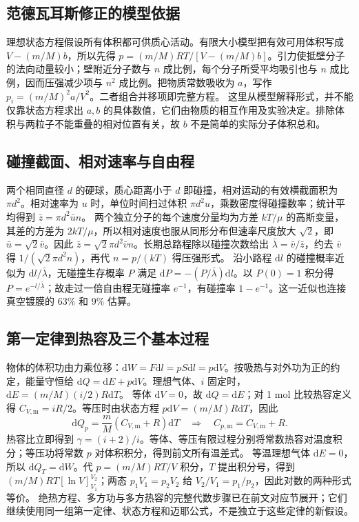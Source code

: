 \documentclass[UTF8,fontset=none,zihao=-4,a4paper]{ctexart}
\begin{document}
\subsection{范德瓦耳斯修正的模型依据}
理想状态方程假设所有体积都可供质心活动。有限大小模型把有效可用体积写成 $V-(m/M)b$，所以先得 $p=(m/M)RT/[V-(m/M)b]$。引力使抵壁分子的法向动量较小；壁附近分子数与 $n$ 成比例，每个分子所受平均吸引也与 $n$ 成比例，因而压强减少项与 $n^2$ 成比例。把物质常数吸收为 $a$，写作 $p_i=(m/M)^2a/V^2$。二者组合并移项即完整方程。
这里从模型解释形式，并不能仅靠状态方程求出 $a,b$ 的具体数值，它们由物质的相互作用及实验决定。排除体积与两粒子不能重叠的相对位置有关，故 $b$ 不是简单的实际分子体积总和。

\subsection{碰撞截面、相对速率与自由程}
两个相同直径 $d$ 的硬球，质心距离小于 $d$ 即碰撞，相对运动的有效横截面积为 $\pi d^2$。相对速率为 $u$ 时，单位时间扫过体积 $\pi d^2u$，乘数密度得碰撞数率；统计平均得到 $\bar z=\pi d^2\bar u n$。
两个独立分子的每个速度分量均为方差 $kT/\mu$ 的高斯变量，其差的方差为 $2kT/\mu$，所以相对速度也服从同形分布但速率尺度放大 $\sqrt2$，即 $\bar u=\sqrt2\bar v$。因此 $\bar z=\sqrt2\pi d^2\bar v n$。长期总路程除以碰撞次数给出 $\bar\lambda=\bar v/\bar z$，约去 $\bar v$ 得 $1/(\sqrt2\pi d^2n)$，再代 $n=p/(kT)$ 得压强形式。
沿小路程 $\mathrm dl$ 的碰撞概率近似为 $\mathrm dl/\bar\lambda$，无碰撞生存概率 $P$ 满足 $\mathrm dP=-(P/\bar\lambda)\mathrm dl$。以 $P(0)=1$ 积分得 $P=e^{-l/\bar\lambda}$；故走过一倍自由程无碰撞率 $e^{-1}$，有碰撞率 $1-e^{-1}$。这一近似也连接真空镀膜的 63\% 和 9\% 估算。

\subsection{第一定律到热容及三个基本过程}
物体的体积功由力乘位移：$\mathrm dW=F\mathrm dl=pS\mathrm dl=p\mathrm dV$。按吸热与对外功为正的约定，能量守恒给 $\mathrm dQ=\mathrm dE+p\mathrm dV$。理想气体、$i$ 固定时，$\mathrm dE=(m/M)(i/2)R\mathrm dT$。
等体 $\mathrm dV=0$，故 $\mathrm dQ=\mathrm dE$；对 1 mol 比较热容定义得 $C_{V,\mathrm m}=iR/2$。等压时由状态方程 $p\mathrm dV=(m/M)R\mathrm dT$，因此
\[
\mathrm dQ_p=\frac mM(C_{V,\mathrm m}+R)\mathrm dT
\quad\Longrightarrow\quad C_{p,\mathrm m}=C_{V,\mathrm m}+R.
\]
热容比立即得到 $\gamma=(i+2)/i$。等体、等压有限过程分别将常数热容对温度积分；等压功将常数 $p$ 对体积积分，得到前文所有温差式。
等温理想气体 $\mathrm dE=0$，所以 $\mathrm dQ_T=\mathrm dW$。代 $p=(m/M)RT/V$ 积分，$T$ 提出积分号，得到 $(m/M)RT[\ln V]_{V_1}^{V_2}$；两态 $p_1V_1=p_2V_2$ 给 $V_2/V_1=p_1/p_2$，因此对数的两种形式等价。
绝热方程、多方功与多方热容的完整代数步骤已在前文对应节展开；它们继续使用同一组第一定律、状态方程和迈耶公式，不是独立于这些定律的新假设。
\end{document}
